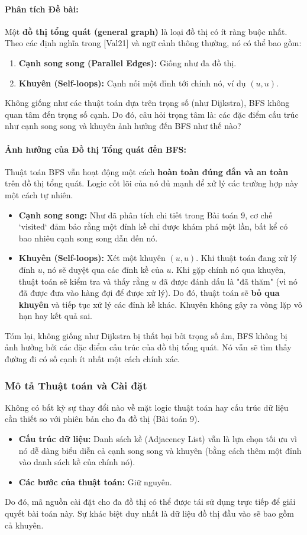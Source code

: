 \documentclass[a4paper,12pt]{article}
\begin{document}
\paragraph{Phân tích Đề bài:}
Một \textbf{đồ thị tổng quát (general graph)} là loại đồ thị có ít ràng buộc nhất. Theo các định nghĩa trong [Val21] và ngữ cảnh thông thường, nó có thể bao gồm:
\begin{enumerate}
    \item \textbf{Cạnh song song (Parallel Edges):} Giống như đa đồ thị.
    \item \textbf{Khuyên (Self-loops):} Cạnh nối một đỉnh tới chính nó, ví dụ $(u, u)$.
\end{enumerate}
Không giống như các thuật toán dựa trên trọng số (như Dijkstra), BFS không quan tâm đến trọng số cạnh. Do đó, câu hỏi trọng tâm là: các đặc điểm cấu trúc như cạnh song song và khuyên ảnh hưởng đến BFS như thế nào?

\paragraph{Ảnh hưởng của Đồ thị Tổng quát đến BFS:}
Thuật toán BFS vẫn hoạt động một cách \textbf{hoàn toàn đúng đắn và an toàn} trên đồ thị tổng quát. Logic cốt lõi của nó đủ mạnh để xử lý các trường hợp này một cách tự nhiên.
\begin{itemize}
    \item \textbf{Cạnh song song:} Như đã phân tích chi tiết trong Bài toán 9, cơ chế `visited` đảm bảo rằng một đỉnh kề chỉ được khám phá một lần, bất kể có bao nhiêu cạnh song song dẫn đến nó.
    \item \textbf{Khuyên (Self-loops):} Xét một khuyên $(u, u)$. Khi thuật toán đang xử lý đỉnh $u$, nó sẽ duyệt qua các đỉnh kề của $u$. Khi gặp chính nó qua khuyên, thuật toán sẽ kiểm tra và thấy rằng $u$ đã được đánh dấu là "đã thăm" (vì nó đã được đưa vào hàng đợi để được xử lý). Do đó, thuật toán sẽ \textbf{bỏ qua khuyên} và tiếp tục xử lý các đỉnh kề khác. Khuyên không gây ra vòng lặp vô hạn hay kết quả sai.
\end{itemize}
Tóm lại, không giống như Dijkstra bị thất bại bởi trọng số âm, BFS không bị ảnh hưởng bởi các đặc điểm cấu trúc của đồ thị tổng quát. Nó vẫn sẽ tìm thấy đường đi có số cạnh ít nhất một cách chính xác.

\subsubsection{Mô tả Thuật toán và Cài đặt}
Không có bất kỳ sự thay đổi nào về mặt logic thuật toán hay cấu trúc dữ liệu cần thiết so với phiên bản cho đa đồ thị (Bài toán 9).
\begin{itemize}
    \item \textbf{Cấu trúc dữ liệu:} Danh sách kề (Adjacency List) vẫn là lựa chọn tối ưu vì nó dễ dàng biểu diễn cả cạnh song song và khuyên (bằng cách thêm một đỉnh vào danh sách kề của chính nó).
    \item \textbf{Các bước của thuật toán:} Giữ nguyên.
\end{itemize}
Do đó, mã nguồn cài đặt cho đa đồ thị có thể được tái sử dụng trực tiếp để giải quyết bài toán này. Sự khác biệt duy nhất là dữ liệu đồ thị đầu vào sẽ bao gồm cả khuyên.
\end{document}
